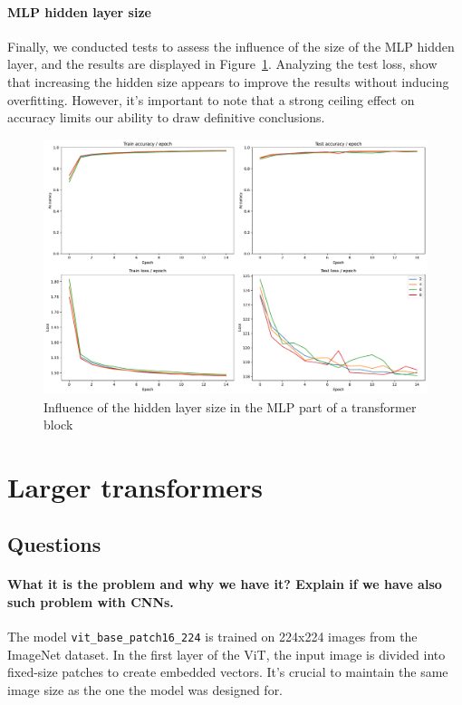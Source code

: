 \paragraph{MLP hidden layer size}
Finally, we conducted tests to assess the influence of the size of the MLP hidden layer, and the results are displayed in Figure~\ref{fig:mlp_ratio_influence}. Analyzing the test loss, show that increasing the hidden size appears to improve the results without inducing overfitting. However, it's important to note that a strong ceiling effect on accuracy limits our ability to draw definitive conclusions.

\begin{figure}[H]
    \centering
    \includegraphics*[width=\textwidth]{figs/Transformers/mlp_ratio_influence.pdf}
    \caption{Influence of the hidden layer size in the MLP part of a transformer block}
    \label{fig:mlp_ratio_influence}
\end{figure}

\section{Larger transformers}
\subsection{Questions}
\paragraph{What it is the problem and why we have it? Explain if we have also such problem with CNNs.}
The model \texttt{vit\_base\_patch16\_224} is trained on 224x224 images from the ImageNet dataset. In the first layer of the ViT, the input image is divided into fixed-size patches to create embedded vectors. It's crucial to maintain the same image size as the one the model was designed for. 

